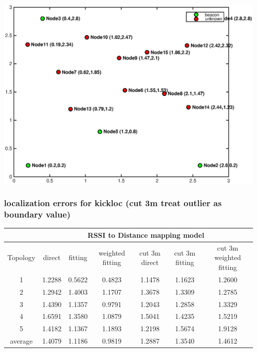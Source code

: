 \documentclass[11pt]{beamer}
\begin{document}
\begin{frame}
\includegraphics[width=\textwidth]{topo1.eps} 
\end{frame}

\begin{frame}
\frametitle{localization errors for kickloc (cut 3m treat outlier as boundary value)}
\tiny
\begin{tabular}{|c|c|c|c|c|c|c|}
\hline 
 & \multicolumn{6}{c|}{RSSI to Distance mapping model} \\ 
\hline 
Topology & direct  & fitting & weighted fitting & cut 3m direct & cut 3m fitting & cut 3m weighted fitting \\ 
\hline 
1 & 1.2288 & 0.5622 & 0.4823 & 1.1478 & 1.1623 & 1.2600 \\ 
\hline 
2 & 1.2942 & 1.4003 & 1.1707 & 1.3678 & 1.3309 & 1.2785 \\ 
\hline 
3 & 1.4390 & 1.1357 & 0.9791 & 1.2043 & 1.2858 & 1.3329 \\ 
\hline 
4 & 1.6591 & 1.3580 & 1.0879 & 1.5041 & 1.4235 & 1.5219 \\ 
\hline 
5 & 1.4182 & 1.1367 & 1.1893 & 1.2198 & 1.5674 & 1.9128 \\ 
\hline 
average & 1.4079 & 1.1186 & 0.9819 & 1.2887 & 1.3540 & 1.4612 \\ 
\hline 
\end{tabular} 
\end{frame}
\end{document}
